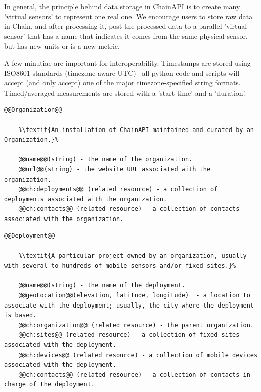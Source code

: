 In general, the principle behind data storage in ChainAPI is to create many 'virtual sensors' to represent one real one.  We encourage users to store raw data in Chain, and after processing it, post the processed data to a parallel 'virtual sensor' that has a name that indicates it comes from the same physical sensor, but has new units or is a new metric. 

A few minutiae are important for interoperability.  Timestamps are stored using ISO8601 standards (timezone aware UTC)-- all python code and scripts will accept (and only accept) one of the major timezone-specified string formats.  Timed/averaged measurements are stored with a 'start time' and a 'duration'.

\begin{lstlisting}[style=codedef]
@@Organization@@
	
	%\textit{An installation of ChainAPI maintained and curated by an Organization.}%

	@@name@@(string) - the name of the organization.
	@@url@@(string) - the website URL associated with the organization.
	@@ch:deployments@@ (related resource) - a collection of deployments associated with the organization.
	@@ch:contacts@@ (related resource) - a collection of contacts associated with the organization.

\end{lstlisting}

\begin{lstlisting}[style=codedef]
@@Deployment@@
	
	%\textit{A particular project owned by an organization, usually with several to hundreds of mobile sensors and/or fixed sites.}%

	@@name@@(string) - the name of the deployment.
	@@geoLocation@@(elevation, latitude, longitude)  - a location to associate with the deployment; usually, the city where the deployment is based.
	@@ch:organization@@ (related resource) - the parent organization.
	@@ch:sites@@ (related resource) - a collection of fixed sites associated with the deployment.
	@@ch:devices@@ (related resource) - a collection of mobile devices associated with the deployment.
	@@ch:contacts@@ (related resource) - a collection of contacts in charge of the deployment.

\end{lstlisting}

